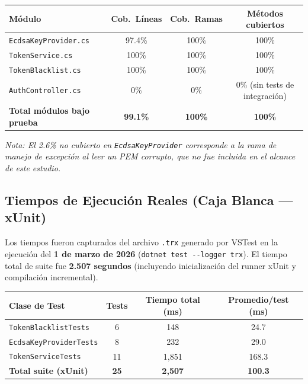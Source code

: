 \documentclass[11pt,a4paper]{article}
\begin{document}
\begin{center}
\renewcommand{\arraystretch}{1.4}
\begin{tabular}{|l|c|c|c|}
\hline
\rowcolor{headerblue}
\color{white}\textbf{Módulo} & \color{white}\textbf{Cob.\ Líneas} & \color{white}\textbf{Cob.\ Ramas} & \color{white}\textbf{Métodos cubiertos} \\
\hline
\texttt{EcdsaKeyProvider.cs}   & 97.4\% & 100\% & 100\% \\
\hline
\rowcolor{rowgray}
\texttt{TokenService.cs}       & 100\%  & 100\% & 100\% \\
\hline
\texttt{TokenBlacklist.cs}     & 100\%  & 100\% & 100\% \\
\hline
\rowcolor{rowgray}
\texttt{AuthController.cs}     & 0\%    & 0\%   & 0\% (sin tests de integración) \\
\hline
\textbf{Total módulos bajo prueba} & \textbf{99.1\%} & \textbf{100\%} & \textbf{100\%} \\
\hline
\end{tabular}
\end{center}

\noindent\textit{Nota: El 2.6\% no cubierto en \texttt{EcdsaKeyProvider} corresponde a la rama de manejo de excepción al leer un PEM corrupto, que no fue incluida en el alcance de este estudio.}

\subsection{Tiempos de Ejecución Reales (Caja Blanca — xUnit)}

\noindent Los tiempos fueron capturados del archivo \texttt{.trx} generado por VSTest en la ejecución del \textbf{1 de marzo de 2026} (\texttt{dotnet test -{}-logger trx}). El tiempo total de suite fue \textbf{2.507 segundos} (incluyendo inicialización del runner xUnit y compilación incremental).

\begin{center}
\renewcommand{\arraystretch}{1.4}
\begin{tabular}{|l|c|c|c|}
\hline
\rowcolor{headerblue}
\color{white}\textbf{Clase de Test} & \color{white}\textbf{Tests} & \color{white}\textbf{Tiempo total (ms)} & \color{white}\textbf{Promedio/test (ms)} \\
\hline
\texttt{TokenBlacklistTests}   & 6  & 148  & 24.7 \\
\hline
\rowcolor{rowgray}
\texttt{EcdsaKeyProviderTests} & 8  & 232  & 29.0 \\
\hline
\texttt{TokenServiceTests}     & 11 & 1{,}851 & 168.3 \\
\hline
\rowcolor{rowgray}
\textbf{Total suite (xUnit)}   & \textbf{25} & \textbf{2{,}507} & \textbf{100.3} \\
\hline
\end{tabular}
\end{center}
\end{document}
